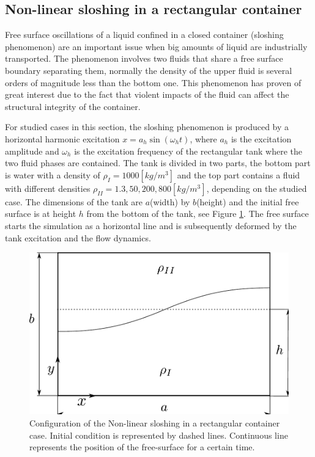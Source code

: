 \subsection{Non-linear sloshing in a rectangular container}\label{sec:Ansari}

Free surface oscillations of a liquid confined in a closed container (sloshing phenomenon) are an important issue when big amounts of liquid are industrially transported. The phenomenon involves two fluids that share a free surface boundary separating them, normally the density of the upper fluid is several orders of magnitude less than the bottom one. This phenomenon has proven of great interest due to the fact that violent impacts of the fluid can affect the structural integrity of the container.

For studied cases in this section, the sloshing phenomenon is produced by a horizontal harmonic excitation $x = a_h \sin (\omega_h t)$, where $a_h$ is the excitation amplitude and $\omega_h$ is the excitation frequency of the rectangular tank where the two fluid phases are contained. The tank is divided in two parts, the bottom part is water with a density of $\rho_{I} = 1000 [kg/m^3]$ and the top part contains a fluid with different densities $\rho_{II} = 1.3, 50, 200, 800 [kg/m^3]$, depending on the studied case. The dimensions of the tank are $a$(width) by $b$(height) and the initial free surface is at height $h$ from the bottom of the tank, see Figure \ref{fg:ansari-config}. The free surface starts the simulation as a horizontal line and is subsequently deformed by the tank excitation and the flow dynamics.

\begin{figure}[H]
  \begin{center}
      \includegraphics[width=.6\columnwidth]{images/ansari_config.pdf}
  \end{center}
  \caption{\label{fg:ansari-config} Configuration of the Non-linear sloshing in a rectangular container case. Initial condition is represented by dashed lines. Continuous line represents the position of the free-surface for a certain time.}
\end{figure}

